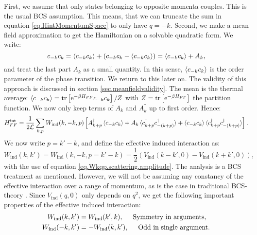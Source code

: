 First, we assume that only states belonging to opposite momenta couples. This is the usual BCS assumption. This means, that we can truncate the sum in equation \eqref{eq.HintMomentumSpace} to only have $q = -k$. Second, we make a mean field approximation to get the Hamiltonian on a solvable quadratic form. We write:
\begin{equation}
c_{-k}c_{k} = \braket{ c_{-k}c_{k} } + \left(c_{-k} c_{k} - \braket{ c_{-k}c_{k} } \right) = \braket{ c_{-k}c_{k} } + A_k, \nonumber 
\end{equation}
and treat the last part $A_k$ as a small quantity. In this sense, $\braket{ c_{-k}c_{k} }$ is the order parameter of the phase transition. We return to this later on. The validity of this approach is discussed in section \ref{sec.meanfieldvalidity}. The mean is the thermal average: $\braket{ c_{-k}c_{k} } = \operatorname{tr}\left[\text{e}^{-\beta H_{FF}}c_{-k}c_{k} \right]/Z$ with $Z = \operatorname{tr}\left[\text{e}^{-\beta H_{FF}}\right]$ the partition function. We now only keep terms of $A_k$ and $A^\dagger_k$ up to first order. Hence:
\begin{equation}
H^\text{int}_{FF} = \frac{1}{2\mathcal{L}} \sum_{k, p} W_{\text{ind}}(k, -k, p)\left[A^\dagger_{k + p}\braket{c_{-k}c_k} + A_{k}\braket{c^\dagger_{k + p}c^\dagger_{-(k+p)}} + \braket{c_{-k}c_k}\braket{c^\dagger_{k + p}c^\dagger_{-(k + p)}}\right]. 
\label{eq.Hint.meanfield.firstexpression}
\end{equation}
We now write $p = k' - k$, and define the effective induced interaction as:
\begin{equation}
W_{\text{ind}}(k, k') = W_{\text{ind}}(k, -k, p = k' - k) = \frac{1}{2}\left(V_{\text{ind}}\left( k - k', 0 \right) - V_{\text{ind}}\left( k + k', 0 \right) \right), 
\label{eq.EffectiveInteraction}
\end{equation}
with the use of equation \eqref{eq.Wkqp.scattering.amplitude}. The analysis is a BCS treatment as mentioned. However, we will not be assuming any constancy of the effective interaction over a range of momentum, as is the case in traditional BCS-theory \cite[chapter 3]{Tinkham}. Since $V_{\text{ind}}(q,0)$ only depends on $q^2$, we get the following important properties of the effective induced interaction: 
\begin{align}
W_{\text{ind}}(k,k') &= W_{\text{ind}}(k',k),   \hspace{0.5cm} \text{Symmetry in arguments}, \nonumber \\
W_{\text{ind}}(-k,k') &= -W_{\text{ind}}(k,k'), \hspace{0.5cm} \text{Odd in single argument}.
\label{eq.EffectiveInteractionSymmetries}
\end{align}

